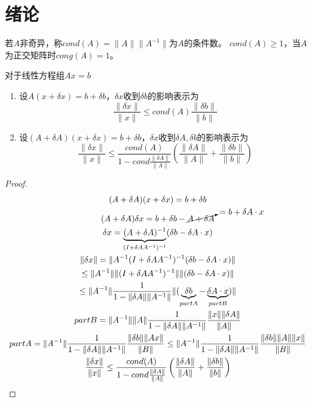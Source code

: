 \section{绪论}
\begin{definition}
    若\(A\)非奇异，称\(cond(A)=\|A\|\|A^{-1}\|\)为\(A\)的条件数。
    \(cond(A)\ge 1\)，当\(A\)为正交矩阵时\(cong(A)=1\)。
\end{definition}
\begin{theorem}
    对于线性方程组\(Ax=b\)
    \begin{enumerate}
        \item 设\(A(x+\delta x)=b+\delta b\text{，}\delta x\text{收到}\delta b \text{的影响表示为}\)
        \[\frac{\|\delta x\|}{\|x\|}\le cond(A)\frac{\|\delta b\|}{\|b\|}\]
        \item 设\((A+\delta A)(x+\delta x)=b+\delta b\text{，}\delta x\text{收到}\delta A,\delta b \text{的影响表示为}\)
        \[\frac{\|\delta x\|}{\|x\|}\le \frac{cond(A)}{1-cond\frac{\|\delta A\|}{\|A\|}}\left(\frac{\|\delta A\|}{\|A\|}
        +\frac{\|\delta b\|}{\|b\|}\right)\]
    \end{enumerate}
    \begin{proof}
        \begin{gather*}
            (A+\delta A)(x+\delta x)=b+\delta b\\
            (A+\delta A)\delta x=b+\delta b -\cancelto{=b+\delta A\cdot x}{A+\delta A}\\
            \delta x=\underbrace{(A+\delta A)^{-1}}_{(I+\delta A A^{-1})^{-1}}(\delta b -\delta A\cdot x)\\
            \|\delta x\|=\|A^{-1}(I+\delta A A^{-1})^{-1}(\delta b-\delta A \cdot x)\|
            \\\le \|A^{-1}\|\|(I+\delta A A^{-1})^{-1}\|\|(\delta b-\delta A \cdot x)\|\\
            \le  \|A^{-1}\|\frac{1}{1-\|\delta A\|\| A^{-1}\|}\|(\underbrace{\delta b}_{partA}-\underbrace{\delta A \cdot x}_{partB})\|\\
            partB = \|A^{-1}\|\|A\|\frac{1}{1-\|\delta A\|\| A^{-1}\|}\frac{\|x\|\|\delta A\|}{\|A\|}\\
            partA=\|A^{-1}\|\frac{1}{1-\|\delta A\|\| A^{-1}\|}\frac{\|\delta b\|\|Ax\|}{\|B\|}
            \le \|A^{-1}\|\frac{1}{1-\|\delta A\|\| A^{-1}\|}\frac{\|\delta b\|\|A\|\|x\|}{\|B\|}\\
            \frac{\|\delta x\|}{\|x\|}\le \frac{cond(A)}{1-cond\frac{\|\delta A\|}{\|A\|}}\left(\frac{\|\delta A\|}{\|A\|}
        +\frac{\|\delta b\|}{\|b\|}\right)
        \end{gather*}
    \end{proof}
\end{theorem}
